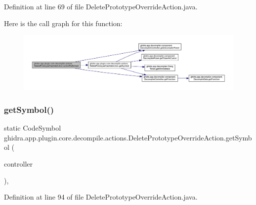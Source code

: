 Definition at line 69 of file Delete\+Prototype\+Override\+Action.\+java.

Here is the call graph for this function\+:
\nopagebreak
\begin{figure}[H]
\begin{center}
\leavevmode
\includegraphics[width=350pt]{classghidra_1_1app_1_1plugin_1_1core_1_1decompile_1_1actions_1_1_delete_prototype_override_action_a387e73291be3b42001b158151b4539a2_cgraph}
\end{center}
\end{figure}
\mbox{\label{classghidra_1_1app_1_1plugin_1_1core_1_1decompile_1_1actions_1_1_delete_prototype_override_action_ada33281811697903f0a753abc6353937}} 
\subsubsection{\texorpdfstring{getSymbol()}{getSymbol()}}
{\footnotesize\ttfamily static Code\+Symbol ghidra.\+app.\+plugin.\+core.\+decompile.\+actions.\+Delete\+Prototype\+Override\+Action.\+get\+Symbol (\begin{DoxyParamCaption}\item[{\mbox{\hyperlink{classghidra_1_1app_1_1decompiler_1_1component_1_1_decompiler_controller}{Decompiler\+Controller}}}]{controller }\end{DoxyParamCaption})\hspace{0.3cm}{\ttfamily [inline]}, {\ttfamily [static]}}



Definition at line 94 of file Delete\+Prototype\+Override\+Action.\+java.

